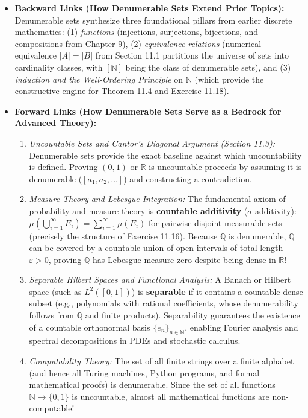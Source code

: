\documentclass[11pt, letterpaper]{article}
\theoremstyle{definition}
\theoremstyle{remark}
\begin{document}
\begin{itemize}
    \item \textbf{Backward Links (How Denumerable Sets Extend Prior Topics):}
    Denumerable sets synthesize three foundational pillars from earlier discrete mathematics: (1) \textit{functions} (injections, surjections, bijections, and compositions from Chapter 9), (2) \textit{equivalence relations} (numerical equivalence $|A| = |B|$ from Section 11.1 partitions the universe of sets into cardinality classes, with $[\mathbb{N}]$ being the class of denumerable sets), and (3) \textit{induction and the Well-Ordering Principle} on $\mathbb{N}$ (which provide the constructive engine for Theorem 11.4 and Exercise 11.18).
    
    \item \textbf{Forward Links (How Denumerable Sets Serve as a Bedrock for Advanced Theory):}
    \begin{enumerate}[label=(\roman*)]
        \item \textit{Uncountable Sets and Cantor's Diagonal Argument (Section 11.3):} Denumerable sets provide the exact baseline against which uncountability is defined. Proving $(0, 1)$ or $\mathbb{R}$ is uncountable proceeds by assuming it is denumerable ($[a_1, a_2, \dots]$) and constructing a contradiction.
        \item \textit{Measure Theory and Lebesgue Integration:} The fundamental axiom of probability and measure theory is \textbf{countable additivity} ($\sigma$-additivity): $\mu\left(\bigcup_{i=1}^\infty E_i\right) = \sum_{i=1}^\infty \mu(E_i)$ for pairwise disjoint measurable sets (precisely the structure of Exercise 11.16). Because $\mathbb{Q}$ is denumerable, $\mathbb{Q}$ can be covered by a countable union of open intervals of total length $\varepsilon > 0$, proving $\mathbb{Q}$ has Lebesgue measure zero despite being dense in $\mathbb{R}$!
        \item \textit{Separable Hilbert Spaces and Functional Analysis:} A Banach or Hilbert space (such as $L^2([0,1])$) is \textbf{separable} if it contains a countable dense subset (e.g., polynomials with rational coefficients, whose denumerability follows from $\mathbb{Q}$ and finite products). Separability guarantees the existence of a countable orthonormal basis $\{e_n\}_{n \in \mathbb{N}}$, enabling Fourier analysis and spectral decompositions in PDEs and stochastic calculus.
        \item \textit{Computability Theory:} The set of all finite strings over a finite alphabet (and hence all Turing machines, Python programs, and formal mathematical proofs) is denumerable. Since the set of all functions $\mathbb{N} \to \{0, 1\}$ is uncountable, almost all mathematical functions are non-computable!
    \end{enumerate}
\end{itemize}
\end{document}
